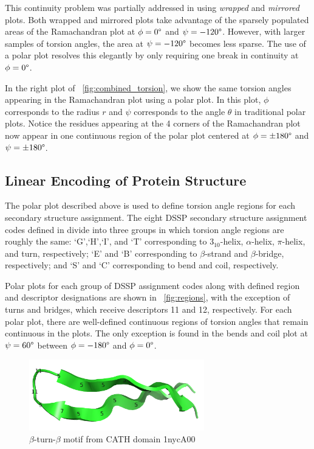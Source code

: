 \documentclass[letter,center,fleqn]{NAR}
\begin{document}
This continuity problem was partially addressed in \cite{Karplus2010} using \emph{wrapped} and \emph{mirrored} plots. 
Both wrapped and mirrored plots take advantage of the sparsely populated areas of the Ramachandran plot at $\phi = 0\degree$ and $\psi = -120\degree$.
However, with larger samples of torsion angles, the area at $\psi = -120\degree$ becomes less sparse. 
The use of a polar plot resolves this elegantly by only requiring one break in continuity at $\phi = 0\degree$. 

In the right plot of \figurename~\ref{fig:combined_torsion}, we show the same torsion angles appearing in the Ramachandran plot using a polar plot. 
In this plot, $\phi$ corresponds to the radius $r$ and $\psi$ corresponds to the angle $\theta$ in traditional polar plots. 
Notice the residues appearing at the 4 corners of the Ramachandran plot now appear in one continuous region of the polar plot centered at $\phi = \pm180\degree$ and $\psi = \pm180\degree$. 

\subsection{Linear Encoding of Protein Structure}

The polar plot described above is used to define torsion angle regions for each secondary structure assignment. 
The eight DSSP secondary structure assignment codes defined in \cite{Kabsch1983} divide into three groups in which torsion angle regions are roughly the same: `G',`H',`I', and `T' corresponding to $3_{10}$-helix, $\alpha$-helix, $\pi$-helix, and turn, respectively; `E' and `B' corresponding to $\beta$-strand and $\beta$-bridge, respectively; and `S' and `C' corresponding to bend and coil, respectively.

Polar plots for each group of DSSP assignment codes along with defined region and descriptor designations are shown in \figurename~\ref{fig:regions}, with the exception of turns and bridges, which receive descriptors 11 and 12, respectively. 
For each polar plot, there are well-defined continuous regions of torsion angles that remain continuous in the plots. 
The only exception is found in the bends and coil plot at $\psi = 60\degree$ between $\phi = -180\degree$ and $\phi = 0\degree$.

\begin{figure}[b]
\begin{center}
\includegraphics[width=3in,keepaspectratio]{1nycA00}
\end{center}
\caption{$\beta$-turn-$\beta$ motif from CATH domain 1nycA00}
\label{fig:beta_turn}
\end{figure}
\end{document}
